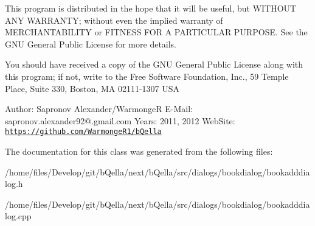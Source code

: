 This program is distributed in the hope that it will be useful, but WITHOUT ANY WARRANTY; without even the implied warranty of MERCHANTABILITY or FITNESS FOR A PARTICULAR PURPOSE. See the GNU General Public License for more details.

You should have received a copy of the GNU General Public License along with this program; if not, write to the Free Software Foundation, Inc., 59 Temple Place, Suite 330, Boston, MA 02111-\/1307 USA

Author: Sapronov Alexander/WarmongeR E-\/Mail: sapronov.alexander92@.gmail.com Years: 2011, 2012 WebSite: \href{https://github.com/WarmongeR1/bQella}{\tt https://github.com/WarmongeR1/bQella} 

The documentation for this class was generated from the following files:\begin{DoxyCompactItemize}
\item 
/home/files/Develop/git/bQella/next/bQella/src/dialogs/bookdialog/bookadddialog.h\item 
/home/files/Develop/git/bQella/next/bQella/src/dialogs/bookdialog/bookadddialog.cpp\end{DoxyCompactItemize}
